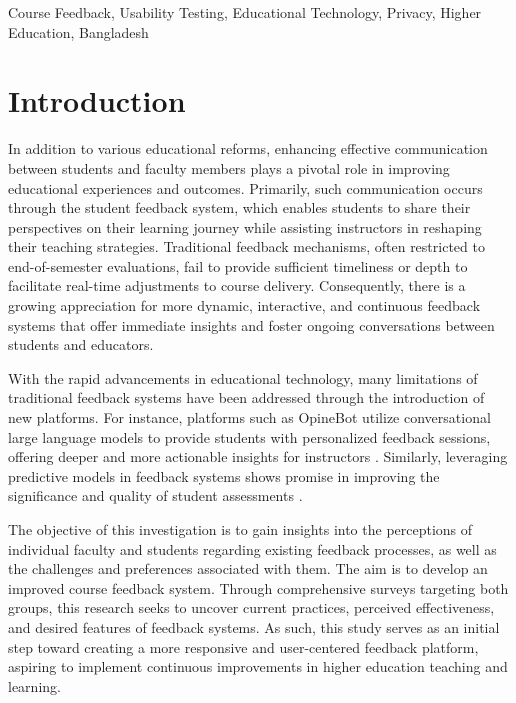 \documentclass[conference]{IEEEtran}
\begin{document}
    \begin{IEEEkeywords}
        Course Feedback, Usability Testing, Educational Technology, Privacy, Higher Education, Bangladesh
        \end{IEEEkeywords}

\section{Introduction}

In addition to various educational reforms, enhancing effective communication between students and faculty members plays a pivotal role in improving educational experiences and outcomes. Primarily, such communication occurs through the student feedback system, which enables students to share their perspectives on their learning journey while assisting instructors in reshaping their teaching strategies. Traditional feedback mechanisms, often restricted to end-of-semester evaluations, fail to provide sufficient timeliness or depth to facilitate real-time adjustments to course delivery. Consequently, there is a growing appreciation for more dynamic, interactive, and continuous feedback systems that offer immediate insights and foster ongoing conversations between students and educators.

With the rapid advancements in educational technology, many limitations of traditional feedback systems have been addressed through the introduction of new platforms. For instance, platforms such as OpineBot utilize conversational large language models to provide students with personalized feedback sessions, offering deeper and more actionable insights for instructors \cite{tanwar2024opinebotclassfeedbackreimagined}. Similarly, leveraging predictive models in feedback systems shows promise in improving the significance and quality of student assessments \cite{friedman2024enhancingstudentfeedbackusing}.

The objective of this investigation is to gain insights into the perceptions of individual faculty and students regarding existing feedback processes, as well as the challenges and preferences associated with them. The aim is to develop an improved course feedback system. Through comprehensive surveys targeting both groups, this research seeks to uncover current practices, perceived effectiveness, and desired features of feedback systems. As such, this study serves as an initial step toward creating a more responsive and user-centered feedback platform, aspiring to implement continuous improvements in higher education teaching and learning.
\end{document}
